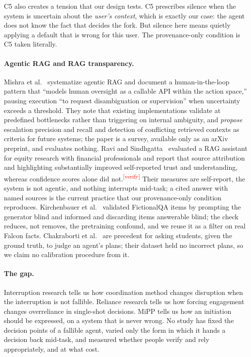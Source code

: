 \documentclass[sigconf,nonacm]{acmart}
\newcommand{\verify}{\textsuperscript{\textcolor{red}{[verify]}}}
\begin{document}
C5 also creates a tension that our design tests. C5 prescribes silence when
the system is uncertain about the \emph{user's context}, which is exactly
our case: the agent does not know the fact that decides the fork. But
silence here means quietly applying a default that is wrong for this user.
The provenance-only condition is C5 taken literally.

\paragraph{Agentic RAG and RAG transparency.}
Mishra et al.~\cite{mishra2026} systematize agentic RAG and document a
human-in-the-loop pattern that ``models human oversight as a callable API
within the action space,'' pausing execution ``to request disambiguation
or supervision'' when uncertainty exceeds a threshold. They note that
existing implementations validate at predefined bottlenecks rather than
triggering on internal ambiguity, and \emph{propose} escalation precision
and recall and detection of conflicting retrieved contexts as criteria
for future systems; the paper is a survey, available only as an arXiv
preprint, and evaluates nothing. Ravi and Sindhgatta~\cite{ravi2025}
evaluated a RAG assistant for equity research with financial
professionals and report that source attribution and highlighting
substantially improved self-reported trust and understanding, whereas
confidence scores alone did not.\verify{}
Their measures are self-report, the system is not agentic, and nothing
interrupts mid-task; a cited answer with named sources is the current
practice that our provenance-only condition reproduces. Kirchenbauer et
al.~\cite{kirchenbauer2026} validated FictionalQA items by prompting the
generator blind and informed and discarding items answerable blind; the
check reduces, not removes, the pretraining confound, and we reuse it as a
filter on real Falcon facts. Chakraborti et al.~\cite{chakraborti2019} are
precedent for asking students, given the ground truth, to judge an agent's
plans; their dataset held no incorrect plans, so we claim no calibration
procedure from it.

\paragraph{The gap.}
Interruption research tells us how coordination method changes disruption
when the interruption is not fallible. Reliance research tells us how
forcing engagement changes overreliance in single-shot decisions. MiPP
tells us how an initiation should be expressed, on a system that is never
wrong. No study has fixed the decision points of a fallible agent, varied
only the form in which it hands a decision back mid-task, and measured
whether people verify and rely appropriately, and at what cost.
\end{document}
